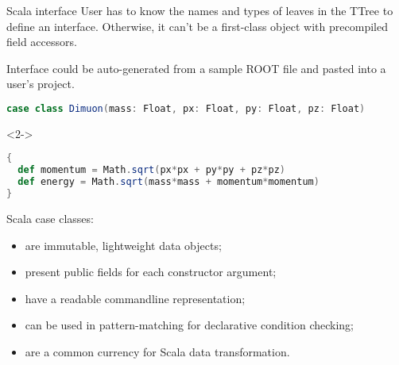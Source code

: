 \documentclass{beamer}
\begin{document}
\begin{frame}[fragile]{Scala interface}
User has to know the names and types of leaves in the TTree to define an interface. Otherwise, it can't be a first-class object with precompiled field accessors.

\vspace{0.5\baselineskip}
Interface could be auto-generated from a sample ROOT file and pasted into a user's project.

\begin{lstlisting}[language=scala]
case class Dimuon(mass: Float, px: Float, py: Float, pz: Float)
\end{lstlisting}

\begin{uncoverenv}<2->
\vspace{-0.35 cm}
\begin{lstlisting}[language=scala]
{
  def momentum = Math.sqrt(px*px + py*py + pz*pz)
  def energy = Math.sqrt(mass*mass + momentum*momentum)
}
\end{lstlisting}
\end{uncoverenv}

Scala case classes:
\begin{itemize}
\item are immutable, lightweight data objects;
\item present public fields for each constructor argument;
\item have a readable commandline representation;
\item can be used in pattern-matching for declarative condition checking;
\item are a common currency for Scala data transformation.
\end{itemize}
\end{frame}
\end{document}
